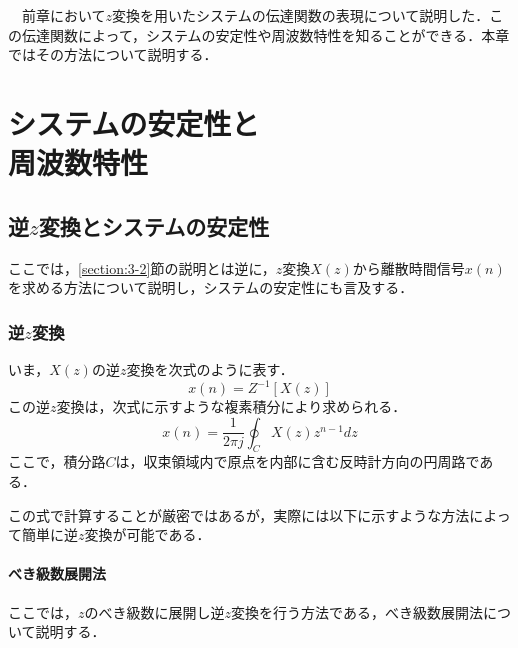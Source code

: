 \begin{lead}

　前章において$z$変換を用いたシステムの伝達関数の表現について説明した．この伝達関数によって，システムの安定性や周波数特性を知ることができる．本章ではその方法について説明する．

\end{lead}

\chapter[システムの安定性と周波数特性]{システムの安定性と\\周波数特性}

\label{chapter:42}

\section{逆$z$変換とシステムの安定性}

ここでは，\ref{section:3-2}節の説明とは逆に，$z$変換$X(z)$から離散時間信号$x(n)$を求める方法について説明し，システムの安定性にも言及する．

\subsection{逆$z$変換}

いま，$X(z)$の逆$z$変換を次式のように表す．
\begin{equation}
x(n)=Z^{-1}[X(z)]
\end{equation}
この逆$z$変換は，次式に示すような複素積分により求められる．
\begin{equation}
x(n)=\frac{1}{2\pi j} \oint_C X(z)z^{n-1}dz
\end{equation}
ここで，積分路$C$は，収束領域内で原点を内部に含む反時計方向の円周路である．

この式で計算することが厳密ではあるが，実際には以下に示すような方法によって簡単に逆$z$変換が可能である．

\subsubsection{べき級数展開法}

ここでは，$z$のべき級数に展開し逆$z$変換を行う方法である，べき級数展開法について説明する．

